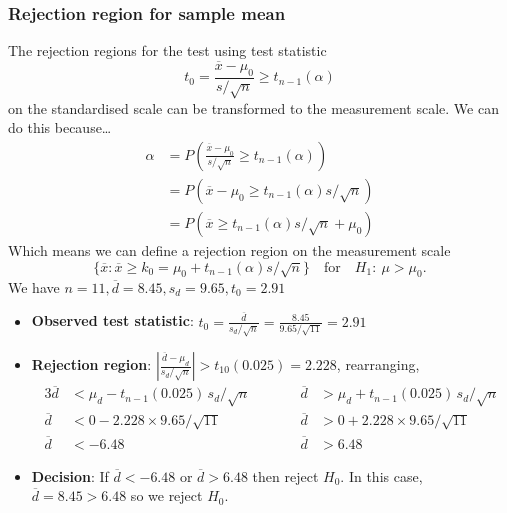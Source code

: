 \documentclass[a4paper]{article}
\begin{document}
\subsubsection{Rejection region for sample mean}
The rejection regions for the test using test statistic
\[
	t_0 = \frac{\overline{x} - \mu_0}{s/\sqrt{n}} \geq t_{n-1}(\alpha)
\]
on the standardised scale can be transformed to the measurement scale.
We can do this because\dots
\begin{align*}
	\alpha & = P\left( \frac{\overline{x} - \mu_0}{s/\sqrt{n}} \geq t_{n-1}(\alpha) \right) \\
	& = P\left( \overline{x} - \mu_0 \ge t_{n-1}(\alpha)s/\sqrt{n} \right) \\
	& = P\left( \overline{x} \ge t_{n-1}(\alpha)s/\sqrt{n} + \mu_0 \right)
\end{align*}
Which means we can define a rejection region on the measurement scale
\[
	\{\overline{x}: \overline{x} \ge k_0=\mu_0+t_{n-1}(\alpha) s/\sqrt{n} \} \quad \text{for} \quad  H_1\colon\ \mu > \mu_0.
\]
We have \( n = 11, \overline{d}=8.45, s_d = 9.65, t_0 = 2.91 \)
\begin{itemize}
	\item \textbf{Observed test statistic}: \( t_0 = \frac{\overline{d}}{s_d/\sqrt n} = \frac{8.45}{9.65/\sqrt{11}}= 2.91 \) 
	\item \textbf{Rejection region}: \( \left|\frac{\overline{d} - \mu_d}{ s_d/\sqrt{n} }\right| > t_{10}(0.025) = 2.228 \), rearranging,
	\begin{alignat*}{3}
		\overline{d} &< \mu_d - t_{n-1}(0.025) \, s_d/\sqrt{n} \qquad &&\overline{d}  &> \mu_d + t_{n-1}(0.025) \, s_d/\sqrt{n} \\
		\overline{d} &< 0 - 2.228 \times 9.65/\sqrt{11} \qquad &&\overline{d}  &> 0 + 2.228 \times 9.65/\sqrt{11} \\
		\overline{d} &< -6.48 \qquad &&\overline{d}  &> 6.48
		\end{alignat*}
	\item \textbf{Decision}: If \( \overline{d} < -6.48 \) or \( \overline{d} > 6.48 \) then reject \( H_0 \). In this case, \( \overline{d} = 8.45 > 6.48 \) so we reject \( H_0 \).
\end{itemize}
\end{document}
